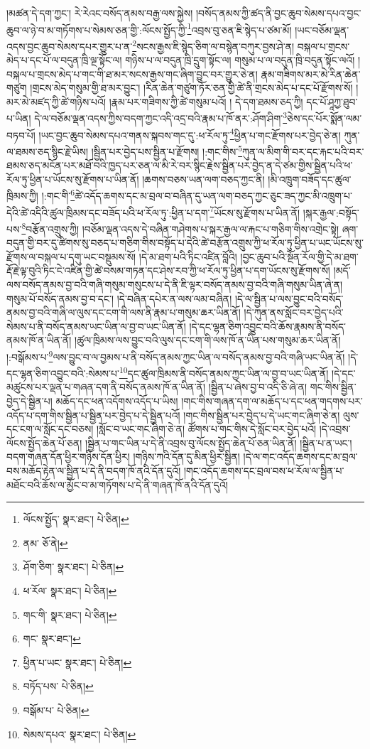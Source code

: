 །མཚན་དེ་དག་ཀྱང་། རེ་རེའང་བསོད་ནམས་བརྒྱ་ལས་སྐྱེས། །བསོད་ནམས་ཀྱི་ཚད་ནི་བྱང་ཆུབ་སེམས་དཔའ་བྱང་ཆུབ་ལ་ཉེ་བ་མ་གཏོགས་པ་སེམས་ཅན་གྱི་:ལོངས་སྤྱོད་ཀྱི་\footnote{ལོངས་སྤྱོད་  སྣར་ཐང་།  པེ་ཅིན། }འབྲས་བུ་ཅན་ཇི་སྙེད་པ་ཙམ་མོ། །ཡང་བཅོམ་ལྡན་འདས་བྱང་ཆུབ་སེམས་དཔར་གྱུར་པ་ན་\footnote{ནམ་  ཅོ་ནེ། }སངས་རྒྱས་ཇི་སྙེད་ཅིག་ལ་བསྙེན་བཀུར་བྱས་ཤེ་ན། བསྐལ་པ་གྲངས་མེད་པ་དང་པོ་ལ་བདུན་ཁྲི་ལྔ་སྟོང་ལ། གཉིས་པ་ལ་བདུན་ཁྲི་དྲུག་སྟོང་ལ། གསུམ་པ་ལ་བདུན་ཁྲི་བདུན་སྟོང་ལའོ། །བསྐལ་པ་གྲངས་མེད་པ་གང་གི་ཐ་མར་སངས་རྒྱས་གང་ཞིག་བྱུང་བར་གྱུར་ཅེ་ན། རྣམ་གཟིགས་མར་མེ་རིན་ཆེན་གཙུག །གྲངས་མེད་གསུམ་གྱི་ཐ་མར་བྱུང་། །རིན་ཆེན་གཙུག་ཏོར་ཅན་གྱི་ཚེ་ནི་གྲངས་མེད་པ་དང་པོ་རྫོགས་སོ། །མར་མེ་མཛད་ཀྱི་ཚེ་གཉིས་པའོ། །རྣམ་པར་གཟིགས་ཀྱི་ཚེ་གསུམ་པའོ། །
དེ་དག་ཐམས་ཅད་ཀྱི། དང་པོ་ཤཱཀྱ་ཐུབ་པ་ཡིན། དེ་ལ་བཅོམ་ལྡན་འདས་ཀྱིས་བདག་ཀྱང་འདི་འདྲ་བའི་རྣམ་པ་ཁོ་ནར་:ཤོག་ཤིག་\footnote{ཤོག་ཅིག་  སྣར་ཐང་།  པེ་ཅིན། }ཅེས་དང་པོར་སྨོན་ལམ་བཏབ་པོ། །ཡང་བྱང་ཆུབ་སེམས་དཔའ་གནས་སྐབས་གང་དུ་:ཕ་རོལ་ཏུ་\footnote{ཕ་རོལ་  སྣར་ཐང་།  པེ་ཅིན། }ཕྱིན་པ་གང་རྫོགས་པར་བྱེད་ཅེ་ན། ཀུན་ལ་ཐམས་ཅད་སྙིང་རྗེ་ཡིས། །སྦྱིན་པར་བྱེད་པས་སྦྱིན་པ་རྫོགས། །:གང་གིས་\footnote{གང་གི་  སྣར་ཐང་།  པེ་ཅིན། }ཀུན་ལ་མིག་གི་བར་དང་རྐང་པའི་བར་ཐམས་ཅད་མངོན་པར་མཐོ་བའི་ཁྱད་པར་ཅན་ལ་མི་རེ་བར་སྙིང་རྗེས་སྦྱིན་པར་བྱེད་ན་དེ་ཙམ་གྱིས་སྦྱིན་པའི་ཕ་རོལ་ཏུ་ཕྱིན་པ་ཡོངས་སུ་རྫོགས་པ་ཡིན་ནོ། །ཆགས་བཅས་ཡན་ལག་བཅད་ཀྱང་ནི། །མི་འཁྲུག་བཟོད་དང་ཚུལ་ཁྲིམས་ཀྱི། །:གང་གི་\footnote{གང་  སྣར་ཐང་། }ཚེ་འདོད་ཆགས་དང་མ་བྲལ་བ་བཞིན་དུ་ཡན་ལག་བཅད་ཀྱང་ཅུང་ཟད་ཀྱང་མི་འཁྲུག་པ་དེའི་ཚེ་འདིའི་ཚུལ་ཁྲིམས་དང་བཟོད་པའི་ཕ་རོལ་ཏུ་:ཕྱིན་པ་དག་\footnote{ཕྱིན་པ་ཡང་  སྣར་ཐང་།  པེ་ཅིན། }ཡོངས་སུ་རྫོགས་པ་ཡིན་ནོ། །སྐར་རྒྱལ་:བསྟོད་པས་\footnote{བཏོད་པས་  པེ་ཅིན། }བརྩོན་འགྲུས་ཀྱི། །བཅོམ་ལྡན་འདས་དེ་བཞིན་གཤེགས་པ་སྐར་རྒྱལ་ལ་རྐང་པ་གཅིག་གིས་འགྲེང་སྟེ། ཞག་བདུན་གྱི་བར་དུ་ཚིགས་སུ་བཅད་པ་གཅིག་གིས་བསྟོད་པ་དེའི་ཚེ་བརྩོན་འགྲུས་ཀྱི་ཕ་རོལ་ཏུ་ཕྱིན་པ་ཡང་ཡོངས་སུ་རྫོགས་ལ་བསྐལ་པ་དགུ་ཡང་བསྡུམས་སོ། །དེ་མ་ཐག་པའི་ཏིང་འཛིན་བློའི། །བྱང་ཆུབ་པའི་སྔོན་རོལ་གྱི་དེ་མ་ཐག་རྡོ་རྗེ་ལྟ་བུའི་ཏིང་ངེ་འཛིན་གྱི་ཚེ་བསམ་གཏན་དང་ཤེས་རབ་ཀྱི་ཕ་རོལ་ཏུ་ཕྱིན་པ་དག་ཡོངས་སུ་རྫོགས་སོ། །མདོ་ལས་བསོད་ནམས་བྱ་བའི་གཞི་གསུམ་གསུངས་པ་དེ་ནི་ཇི་ལྟར་བསོད་ནམས་བྱ་བའི་གཞི་གསུམ་ཡིན་ཞེ་ན། གསུམ་པོ་བསོད་ནམས་བྱ་བ་དང་། །དེ་བཞིན་དཔེར་ན་ལས་ལམ་བཞིན། །དེ་ལ་སྦྱིན་པ་ལས་བྱུང་བའི་བསོད་ནམས་བྱ་བའི་གཞི་ལ་ལུས་དང་ངག་གི་ལས་ནི་རྣམ་པ་གསུམ་ཆར་ཡིན་ནོ། །དེ་ཀུན་ནས་སློང་བར་བྱེད་པའི་སེམས་པ་ནི་བསོད་ནམས་ཡང་ཡིན་ལ་བྱ་བ་ཡང་ཡིན་ནོ། །དེ་དང་ལྷན་ཅིག་འབྱུང་བའི་ཆོས་རྣམས་ནི་བསོད་ནམས་ཁོ་ན་ཡིན་ནོ། །ཚུལ་ཁྲིམས་ལས་བྱུང་བའི་ལུས་དང་ངག་གི་ལས་ཁོ་ན་ཡིན་པས་གསུམ་ཆར་ཡིན་ནོ། །:བསྒོམས་པ་\footnote{བསྒོམ་པ་  པེ་ཅིན། }ལས་བྱུང་བ་ལ་བྱམས་པ་ནི་བསོད་ནམས་ཀྱང་ཡིན་ལ་བསོད་ནམས་བྱ་བའི་གཞི་ཡང་ཡིན་ནོ། །དེ་དང་ལྷན་ཅིག་འབྱུང་བའི་:སེམས་པ་\footnote{སེམས་དཔའ་  སྣར་ཐང་།  པེ་ཅིན། }དང་ཚུལ་ཁྲིམས་ནི་བསོད་ནམས་ཀྱང་ཡིན་ལ་བྱ་བ་ཡང་ཡིན་ནོ། །དེ་དང་མཚུངས་པར་ལྡན་པ་གཞན་དག་ནི་བསོད་ནམས་ཁོ་ན་ཡིན་ནོ། །སྦྱིན་པ་ཞེས་བྱ་བ་འདི་ཅི་ཞེ་ན། གང་གིས་སྦྱིན་བྱེད་དེ་སྦྱིན་པ། མཆོད་དང་ཕན་འདོགས་འདོད་པ་ཡིས། །གང་གིས་གཞན་དག་ལ་མཆོད་པ་དང་ཕན་གདགས་པར་འདོད་པ་དག་གིས་སྦྱིན་པ་སྦྱིན་པར་བྱེད་པ་དེ་སྦྱིན་པའོ། །གང་གིས་སྦྱིན་པར་བྱེད་པ་དེ་ཡང་གང་ཞིག་ཅེ་ན། ལུས་དང་ངག་ལ་སློང་དང་བཅས། །སློང་བ་ཡང་གང་ཞིག་ཅེ་ན། ཚོགས་པ་གང་གིས་དེ་སློང་བར་བྱེད་པའོ། །དེ་འབྲས་ལོངས་སྤྱོད་ཆེན་པོ་ཅན། །སྦྱིན་པ་གང་ཡིན་པ་དེ་ནི་འབྲས་བུ་ལོངས་སྤྱོད་ཆེན་པོ་ཅན་ཡིན་ནོ། །སྦྱིན་པ་ན་ཡང་། བདག་གཞན་དོན་ཕྱིར་གཉིས་དོན་ཕྱིར། །གཉིས་ཀའི་དོན་དུ་མིན་ཕྱིར་སྦྱིན། །དེ་ལ་གང་འདོད་ཆགས་དང་མ་བྲལ་བས་མཆོད་རྟེན་ལ་སྦྱིན་པ་དེ་ནི་བདག་ཁོ་ནའི་དོན་དུའོ། །གང་འདོད་ཆགས་དང་བྲལ་བས་ཕ་རོལ་ལ་སྦྱིན་པ་མཐོང་བའི་ཆོས་ལ་མྱོང་བ་མ་གཏོགས་པ་དེ་ནི་གཞན་ཁོ་ནའི་དོན་དུའོ། 
